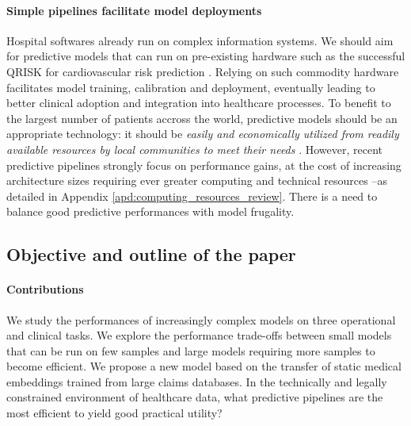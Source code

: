 \documentclass[french,12pt,twoside,a4paper]{book}
\begin{document}
\paragraph{Simple pipelines facilitate model deployments}

Hospital softwares already run on complex information systems. We should aim for
predictive models that can run on pre-existing hardware such as the successful
QRISK for cardiovascular risk prediction \citep{hippisley2017development}.
Relying on such commodity hardware facilitates model training, calibration and
deployment, eventually leading to better clinical adoption and integration into
healthcare processes. To benefit to the largest number of patients accross the
world, predictive models should be an appropriate technology: it should be
\emph{easily and economically utilized from readily available resources by local
  communities to meet their needs} \citep{pearce2012case}. However, recent
predictive pipelines strongly focus on performance gains, at the cost of
increasing architecture sizes requiring ever greater computing and technical
resources --as detailed in Appendix \ref{apd:computing_resources_review}.
There is a need to balance good predictive performances with model frugality.

\subsection{Objective and outline of the paper}%
\label{subsec:predictive_models:contribution}%

\paragraph{Contributions}
We study the performances of increasingly complex models on three operational
and clinical tasks. We explore the performance trade-offs between small models
that can be run on few samples and large models requiring more samples to become
efficient. We propose a new model based on the transfer of static medical
embeddings trained from large claims databases. In the technically and legally
constrained environment of healthcare data, what predictive pipelines are the
most efficient to yield good practical utility?
\end{document}
